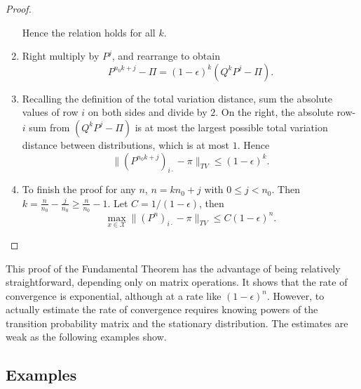 \documentclass[12pt]{article}
\begin{document}
\begin{proof}
\begin{enumerate}
\[            \] Hence the relation holds for all \( k \).
        \item
            Right multiply by \( P^j \), and rearrange to obtain
            \[
                P^{n_0 k+j} - \Pi = (1-\epsilon)^k (Q^k P^j - \Pi).
            \]
        \item
            Recalling the definition of the total variation distance,
            sum the absolute values of row \( i \) on both sides and
            divide by \( 2 \).  On the right, the absolute row-\( i \)
            sum from \( (Q^k P^j - \Pi) \) is at most the largest
            possible total variation distance between distributions,
            which is at most \( 1 \).  Hence
            \[
                \| (P^{n_0 k+j})_{i \cdot} - \pi \|_{TV} \le (1-\epsilon)^k.
            \]
        \item
            To finish the proof for any \( n \), \( n = kn_0 + j \) with
            \( 0 \le j < n_0 \).  Then \( k = \frac{n}{n_0} - \frac{j}{n_0}
            \ge \frac{n}{n_0} - 1 \).  Let \( C= 1/(1-\epsilon) \), then
            \[
                \max_{x \in \mathcal{X}} \| (P^n)_{i \cdot} - \pi \|_{TV}
                \le C (1-\epsilon)^n.
            \]
    \end{enumerate}
\end{proof}

This proof of the Fundamental Theorem has the advantage of being
relatively straightforward, depending only on matrix operations.  It
shows that the rate of convergence is exponential, although at a rate
like \( (1-\epsilon)^n \).  However, to actually estimate the rate of
convergence requires knowing powers of the transition probability matrix
and the stationary distribution.  The estimates are weak as the
following examples show.

\subsection*{Examples}
\end{document}
